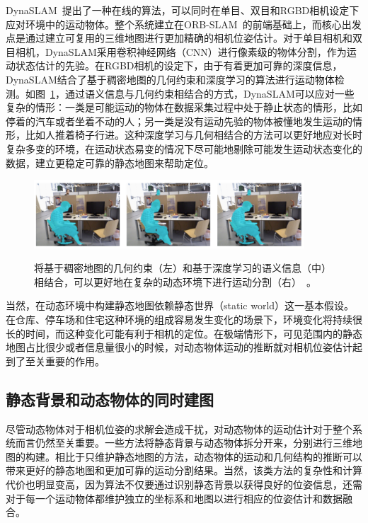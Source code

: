 DynaSLAM~\cite{DynaSLAM}提出了一种在线的算法，可以同时在单目、双目和RGBD相机设定下应对环境中的运动物体。整个系统建立在ORB-SLAM~\cite{orbslam2}的前端基础上，而核心出发点是通过建立可复用的三维地图进行更加精确的相机位姿估计。对于单目相机和双目相机，DynaSLAM采用卷积神经网络（CNN）进行像素级的物体分割，作为运动状态估计的先验。在RGBD相机的设定下，由于有着更加可靠的深度信息，DynaSLAM结合了基于稠密地图的几何约束和深度学习的算法进行运动物体检测。如图~\ref{fig:dynaSLAM}，通过语义信息与几何约束相结合的方式，DynaSLAM可以应对一些复杂的情形：一类是可能运动的物体在数据采集过程中处于静止状态的情形，比如停着的汽车或者坐着不动的人；另一类是没有运动先验的物体被懂地发生运动的情形，比如人推着椅子行进。这种深度学习与几何相结合的方法可以更好地应对长时复杂多变的环境，在运动状态易变的情况下尽可能地剔除可能发生运动状态变化的数据，建立更稳定可靠的静态地图来帮助定位。

\begin{figure}[!htbp]
	\centering
	\includegraphics[width=0.9\textwidth]{figs/2-1/dynaSLAM.jpeg}
	\label{fig:dynaSLAM}
	\caption{将基于稠密地图的几何约束（左）和基于深度学习的语义信息（中）相结合，可以更好地在复杂的动态环境下进行运动分割（右）~\cite{DynaSLAM}。}
\end{figure}

当然，在动态环境中构建静态地图依赖静态世界（static world）这一基本假设。在仓库、停车场和住宅这种环境的组成容易发生变化的场景下，环境变化将持续很长的时间，而这种变化可能有利于相机的定位。在极端情形下，可见范围内的静态地图占比很少或者信息量很小的时候，对动态物体运动的推断就对相机位姿估计起到了至关重要的作用。

\subsection{静态背景和动态物体的同时建图}
\label{subsec:static_and_dynamic}
尽管动态物体对于相机位姿的求解会造成干扰，对动态物体的运动估计对于整个系统而言仍然至关重要。一些方法将静态背景与动态物体拆分开来，分别进行三维地图的构建。相比于只维护静态地图的方法，动态物体的运动和几何结构的推断可以带来更好的静态地图和更加可靠的运动分割结果。当然，该类方法的复杂性和计算代价也明显变高，因为算法不仅要通过识别静态背景以获得良好的位姿信息，还需对于每一个运动物体都维护独立的坐标系和地图以进行相应的位姿估计和数据融合。

